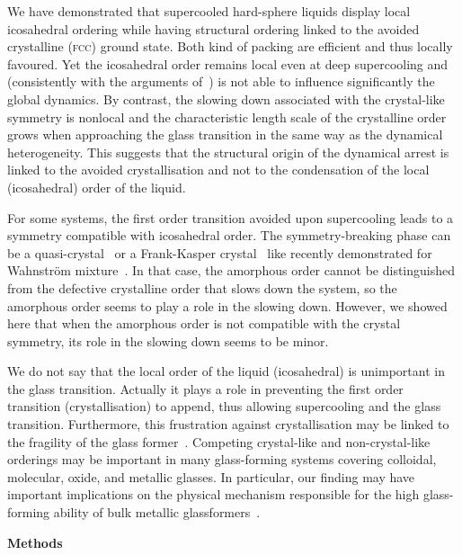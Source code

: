 We have demonstrated that supercooled hard-sphere liquids display local icosahedral ordering while having structural ordering linked to the avoided crystalline (\textsc{fcc}) ground state. Both kind of packing are efficient and thus locally favoured. Yet the icosahedral order remains local even at deep supercooling and (consistently with the arguments of~\citep{Berthier2007}) is not able to influence significantly the global dynamics. By contrast, the slowing down associated with the crystal-like symmetry is nonlocal and the characteristic length scale of the crystalline order grows when approaching the glass transition in the same way as the dynamical heterogeneity. This suggests that the structural origin of the dynamical arrest is linked to the avoided crystallisation and not to the condensation of the local (icosahedral) order of the liquid.

For some systems, the first order transition avoided upon supercooling leads to a symmetry compatible with icosahedral order. The symmetry-breaking phase can be a quasi-crystal~\citep{Dzugutov1993} or a Frank-Kasper crystal~\citep{Frank1959,Frank1958} like recently demonstrated for Wahnstr\"om mixture~\citep{Pedersen2010}. In that case, the amorphous order cannot be distinguished from the defective crystalline order that slows down the system, so the amorphous order seems to play a role in the slowing down. However, we showed here that when the amorphous order is not compatible with the crystal symmetry, its role in the slowing down seems to be minor.

We do not say that the local order of the liquid (icosahedral) is unimportant in the glass transition. Actually it plays a role in preventing the first order transition (crystallisation) to append, thus allowing supercooling and the glass transition. Furthermore, this frustration against crystallisation may be linked to the fragility of the glass former~\citep{tanaka1999top}. Competing crystal-like and non-crystal-like orderings may be important in many glass-forming systems covering colloidal, molecular, oxide, and metallic glasses. 
In particular, our finding may have important implications on the physical mechanism responsible for the high glass-forming ability of bulk metallic glassformers~\cite{Wang2004}. 

\vspace{1cm}
\noindent
\textbf{Methods}

